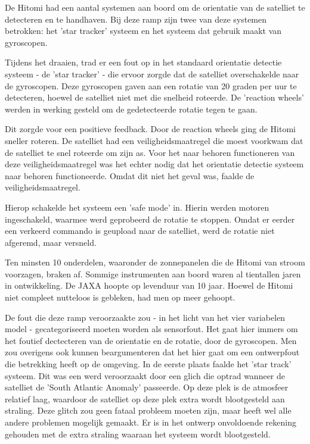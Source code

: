 \documentclass{article}
\begin{document}
					De Hitomi had een aantal systemen aan boord om de orientatie van de satelliet te detecteren en te handhaven. Bij deze ramp zijn twee van deze systemen betrokken: het 'star tracker' systeem en het systeem dat gebruik maakt van gyroscopen. \par

					 Tijdens het draaien, trad er een fout op in het standaard orientatie detectie systeem - de 'star tracker' - die ervoor zorgde dat de satelliet overschakelde naar de gyroscopen. Deze gyroscopen gaven aan een rotatie van 20 graden per uur te detecteren, hoewel de satelliet niet met die snelheid roteerde. De 'reaction wheels' werden in werking gesteld om de gedetecteerde rotatie tegen te gaan. \par

					Dit zorgde voor een positieve feedback. Door de reaction wheels ging de Hitomi sneller roteren. De satelliet had een veiligheidsmaatregel die moest voorkwam dat de satelliet te snel roteerde om zijn as. Voor het naar behoren functioneren van deze veiligheidsmaatregel was het echter nodig dat het orientatie detectie systeem naar behoren functioneerde. Omdat dit niet het geval was, faalde de veiligheidsmaatregel. \par

					Hierop schakelde het systeem een 'safe mode' in. Hierin werden motoren ingeschakeld, waarmee werd geprobeerd de rotatie te stoppen. Omdat er eerder een verkeerd commando is geupload naar de satelliet, werd de rotatie niet afgeremd, maar versneld. \par

					Ten minsten 10 onderdelen, waaronder de zonnepanelen die de Hitomi van stroom voorzagen, braken af. Sommige instrumenten aan boord waren al tientallen jaren in ontwikkeling. De JAXA hoopte op levenduur van 10 jaar. Hoewel de Hitomi niet compleet nutteloos is gebleken, had men op meer gehoopt. \cite{witze2016software} \par 

					De fout die deze ramp veroorzaakte zou - in het licht van het vier variabelen model - gecategoriseerd moeten worden als sensorfout. Het gaat hier immers om het foutief dectecteren van de orientatie en de rotatie, door de gyroscopen. Men zou overigens ook kunnen beargumenteren dat het hier gaat om een ontwerpfout die betrekking heeft op de omgeving. In de eerste plaats faalde het 'star track' systeem. Dit was een werd veroorzaakt door een glich die optrad wanneer de satelliet de 'South Atlantic Anomaly' passeerde. Op deze plek is de atmosfeer relatief laag, waardoor de satelliet op deze plek extra wordt blootgesteld aan straling. Deze glitch zou geen fataal probleem moeten zijn, maar heeft wel alle andere problemen mogelijk gemaakt. Er is in het ontwerp onvoldoende rekening gehouden met de extra straling waaraan het systeem wordt blootgesteld. \par
				
\end{document}
